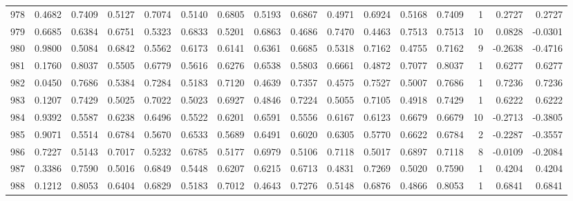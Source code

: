 \begin{tabular}{lrrrrrrrrrrrrrrr}
978 &      0.4682 &  0.7409 &  0.5127 &  0.7074 &  0.5140 &  0.6805 &  0.5193 &  0.6867 &  0.4971 &  0.6924 &   0.5168 &     0.7409 &      1 &                    0.2727 &                     0.2727 \\
979 &      0.6685 &  0.6384 &  0.6751 &  0.5323 &  0.6833 &  0.5201 &  0.6863 &  0.4686 &  0.7470 &  0.4463 &   0.7513 &     0.7513 &     10 &                    0.0828 &                    -0.0301 \\
980 &      0.9800 &  0.5084 &  0.6842 &  0.5562 &  0.6173 &  0.6141 &  0.6361 &  0.6685 &  0.5318 &  0.7162 &   0.4755 &     0.7162 &      9 &                   -0.2638 &                    -0.4716 \\
981 &      0.1760 &  0.8037 &  0.5505 &  0.6779 &  0.5616 &  0.6276 &  0.6538 &  0.5803 &  0.6661 &  0.4872 &   0.7077 &     0.8037 &      1 &                    0.6277 &                     0.6277 \\
982 &      0.0450 &  0.7686 &  0.5384 &  0.7284 &  0.5183 &  0.7120 &  0.4639 &  0.7357 &  0.4575 &  0.7527 &   0.5007 &     0.7686 &      1 &                    0.7236 &                     0.7236 \\
983 &      0.1207 &  0.7429 &  0.5025 &  0.7022 &  0.5023 &  0.6927 &  0.4846 &  0.7224 &  0.5055 &  0.7105 &   0.4918 &     0.7429 &      1 &                    0.6222 &                     0.6222 \\
984 &      0.9392 &  0.5587 &  0.6238 &  0.6496 &  0.5522 &  0.6201 &  0.6591 &  0.5556 &  0.6167 &  0.6123 &   0.6679 &     0.6679 &     10 &                   -0.2713 &                    -0.3805 \\
985 &      0.9071 &  0.5514 &  0.6784 &  0.5670 &  0.6533 &  0.5689 &  0.6491 &  0.6020 &  0.6305 &  0.5770 &   0.6622 &     0.6784 &      2 &                   -0.2287 &                    -0.3557 \\
986 &      0.7227 &  0.5143 &  0.7017 &  0.5232 &  0.6785 &  0.5177 &  0.6979 &  0.5106 &  0.7118 &  0.5017 &   0.6897 &     0.7118 &      8 &                   -0.0109 &                    -0.2084 \\
987 &      0.3386 &  0.7590 &  0.5016 &  0.6849 &  0.5448 &  0.6207 &  0.6215 &  0.6713 &  0.4831 &  0.7269 &   0.5020 &     0.7590 &      1 &                    0.4204 &                     0.4204 \\
988 &      0.1212 &  0.8053 &  0.6404 &  0.6829 &  0.5183 &  0.7012 &  0.4643 &  0.7276 &  0.5148 &  0.6876 &   0.4866 &     0.8053 &      1 &                    0.6841 &                     0.6841 \\

\end{tabular}
